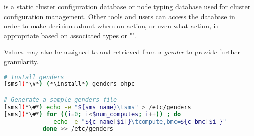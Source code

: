 \genders{} is a static cluster configuration database or node typing database
used for cluster configuration management. Other tools and users can access the
\genders{} database in order to make decisions about where an action, or even
what action, is appropriate based on associated types or "\genders{}".

Values may also be assigned to and retrieved from a {\em gender} to provide
further granularity.

\begin{lstlisting}[language=bash,keywords={},upquote=true]
# Install genders
[sms](*\#*) (*\install*) genders-ohpc

# Generate a sample genders file
[sms](*\#*) echo -e "${sms_name}\tsms" > /etc/genders
[sms](*\#*) for ((i=0; i<$num_computes; i++)) ; do
              echo -e "${c_name[$i]}\tcompute,bmc=${c_bmc[$i]}"
           done >> /etc/genders
\end{lstlisting}

